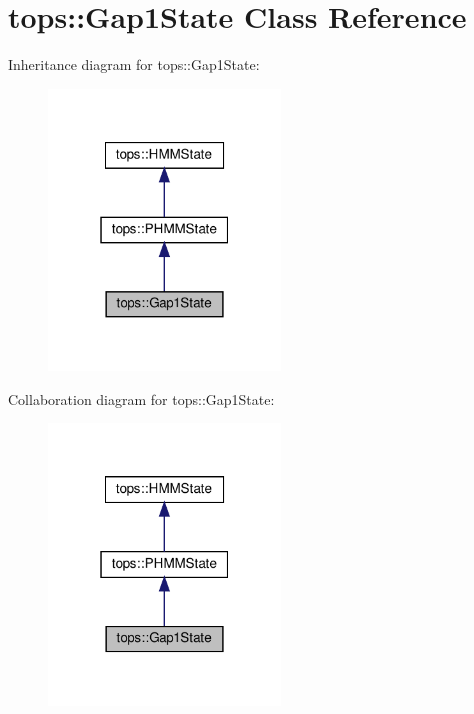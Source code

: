\hypertarget{classtops_1_1Gap1State}{}\section{tops\+:\+:Gap1\+State Class Reference}
\label{classtops_1_1Gap1State}


Inheritance diagram for tops\+:\+:Gap1\+State\+:
\nopagebreak
\begin{figure}[H]
\begin{center}
\leavevmode
\includegraphics[width=175pt]{classtops_1_1Gap1State__inherit__graph}
\end{center}
\end{figure}


Collaboration diagram for tops\+:\+:Gap1\+State\+:
\nopagebreak
\begin{figure}[H]
\begin{center}
\leavevmode
\includegraphics[width=175pt]{classtops_1_1Gap1State__coll__graph}
\end{center}
\end{figure}
